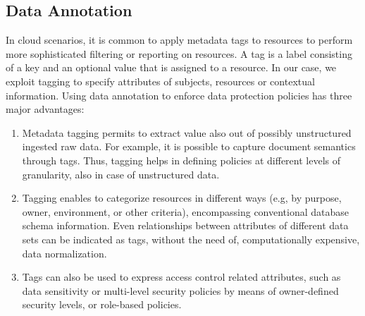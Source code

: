 \subsection{Data Annotation}

In cloud scenarios, it is common to apply metadata tags to resources to perform more sophisticated filtering or reporting on resources. A tag is a label consisting of a key and an optional value that is assigned to a resource. In our case, we exploit tagging to specify attributes of subjects, resources or contextual information. Using data annotation to enforce data protection policies has three major advantages: \begin{enumerate}
\item Metadata tagging permits to extract value also out of possibly unstructured ingested raw data. For example, it is possible to capture document semantics through tags. Thus, tagging helps in defining policies at different levels of granularity, also in case of unstructured data.
\item Tagging enables to categorize resources in different ways (e.g, by purpose, owner, environment, or other criteria), encompassing conventional database schema information. Even relationships between attributes of different data sets can be indicated as tags, without the need of, computationally expensive, data normalization. 
\item Tags can also be used to express access control related attributes, such as data sensitivity or multi-level security policies by means of owner-defined security levels, or role-based policies. 
\end{enumerate}

